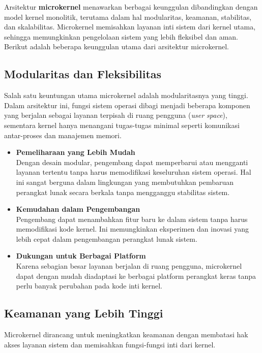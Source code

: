 Arsitektur \textbf{microkernel} menawarkan berbagai keunggulan dibandingkan dengan model kernel monolitik, terutama dalam hal modularitas, keamanan, stabilitas, dan skalabilitas. Microkernel memisahkan layanan inti sistem dari kernel utama, sehingga memungkinkan pengelolaan sistem yang lebih fleksibel dan aman. Berikut adalah beberapa keunggulan utama dari arsitektur microkernel.

\subsection{Modularitas dan Fleksibilitas}

Salah satu keuntungan utama microkernel adalah modularitasnya yang tinggi. Dalam arsitektur ini, fungsi sistem operasi dibagi menjadi beberapa komponen yang berjalan sebagai layanan terpisah di ruang pengguna (\textit{user space}), sementara kernel hanya menangani tugas-tugas minimal seperti komunikasi antar-proses dan manajemen memori.

\begin{itemize}
	\item \textbf{Pemeliharaan yang Lebih Mudah} \\
	Dengan desain modular, pengembang dapat memperbarui atau mengganti layanan tertentu tanpa harus memodifikasi keseluruhan sistem operasi. Hal ini sangat berguna dalam lingkungan yang membutuhkan pembaruan perangkat lunak secara berkala tanpa mengganggu stabilitas sistem.
	
	\item \textbf{Kemudahan dalam Pengembangan} \\
	Pengembang dapat menambahkan fitur baru ke dalam sistem tanpa harus memodifikasi kode kernel. Ini memungkinkan eksperimen dan inovasi yang lebih cepat dalam pengembangan perangkat lunak sistem.
	
	\item \textbf{Dukungan untuk Berbagai Platform} \\
	Karena sebagian besar layanan berjalan di ruang pengguna, microkernel dapat dengan mudah diadaptasi ke berbagai platform perangkat keras tanpa perlu banyak perubahan pada kode inti kernel.
\end{itemize}

\subsection{Keamanan yang Lebih Tinggi}

Microkernel dirancang untuk meningkatkan keamanan dengan membatasi hak akses layanan sistem dan memisahkan fungsi-fungsi inti dari kernel.

